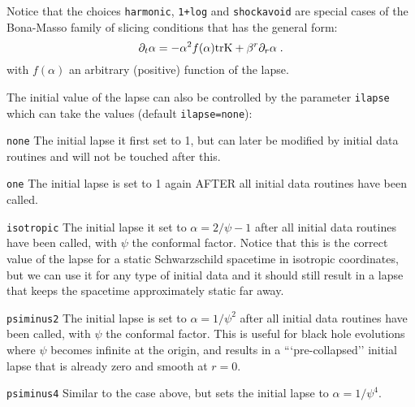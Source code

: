 \documentclass[12pt]{article}
\begin{document}
\vspace{3mm}

Notice that the choices \texttt{harmonic}, \texttt{1+log} and
\texttt{shockavoid} are special cases of the Bona-Masso family of
slicing conditions that has the general form:
\begin{equation}
\partial_t \alpha = - \alpha^2 f(\alpha) {\rm trK} + \beta^r \partial_r \alpha\; .
\end{equation}
with $f(\alpha)$ an arbitrary (positive) function of the lapse.
 
\vspace{5mm}

The initial value of the lapse can also be controlled by the parameter
\texttt{ilapse} which can take the values (default
\texttt{ilapse=none}):

\begin{list}{}{
\setlength{\leftmargin}{35mm}
\setlength{\labelsep}{10mm}
\setlength{\labelwidth}{20mm}}

\item[\texttt{none}] The initial lapse it first set to 1, but can
  later be modified by initial data routines and will not be touched
  after this.

\item[\texttt{one}] The initial lapse is set to 1 again AFTER all
  initial data routines have been called.

\item[\texttt{isotropic}] The initial lapse it set to
  $\alpha=2/\psi-1$ after all initial data routines have been called,
  with $\psi$ the conformal factor.  Notice that this is the correct
  value of the lapse for a static Schwarzschild spacetime in isotropic
  coordinates, but we can use it for any type of initial data and it
  should still result in a lapse that keeps the spacetime
  approximately static far away.

\item[\texttt{psiminus2}] The initial lapse is set to
  $\alpha=1/\psi^2$ after all initial data routines have been called,
  with $\psi$ the conformal factor. This is useful for black hole
  evolutions where $\psi$ becomes infinite at the origin, and results
  in a ```pre-collapsed'' initial lapse that is already zero and
  smooth at $r=0$.

\item[\texttt{psiminus4}] Similar to the case above, but sets the
  initial lapse to $\alpha=1/\psi^4$.

\end{list}
\end{document}
